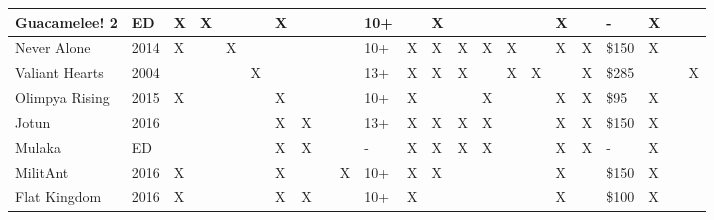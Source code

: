 \begin{table}[htbp]
{\begin{tabular}{|l|l|l|l|l|l|l|l|l|l|l|l|l|l|l|l|l|l|l|l|l|l|l|}
			Guacamelee! 2                                & ED                     & X          & X           &        &        & X      &          &     &         & 10+  &    & X    &           &          &       &         & X        &          & -                                           & X          &               &         \\ \hline
			Never Alone                                  & 2014                   & X          &             & X      &        &        &          &     &         & 10+  & X  & X    & X         & X        & X     &         & X        & X        & \$150                                       & X          &               &         \\ \hline
			Valiant Hearts                               & 2004                   &            &             &        & X      &        &          &     &         & 13+  & X  & X    & X         &          & X     & X       &          & X        & \$285                                       &            &               & X       \\ \hline
			Olimpya Rising                               & 2015                   & X          &             &        &        & X      &          &     &         & 10+  & X  &      &           & X        &       &         & X        & X        & \$95                                        & X          &               &         \\ \hline
			Jotun                      & 2016                   &            &             &        &        & X      & X        &     &         & 13+  & X  & X    & X         & X        &       &         & X        & X        & \$150                                       & X          &               &         \\ \hline
			Mulaka                                       & ED                     &            &             &        &        & X      & X        &     &         & -    & X  & X    & X         & X        &       &         & X        & X        & -                                           & X          &               &         \\ \hline
			MilitAnt                                     & 2016                   & X          &             &        &        & X      &          &     & X       & 10+  & X  & X    &           &          &       &         & X        &          & \$150                                       & X          &               &         \\ \hline
			Flat Kingdom                                 & 2016                   & X          &             &        &        & X      & X        &     &         & 10+  & X  &      &           &          &       &         & X        &          & \$100                                       & X          &               &         \\ \hline

\end{tabular}}
\end{table}

